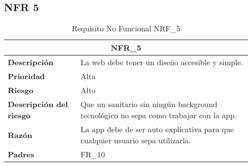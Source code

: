 \documentclass{scrreprt}
\begin{document}
\subsection{NFR 5}
\begin{table}[H]
    \label{tab:my-table}
    \begin{tabular}{|p{5cm}|p{11cm}|}
    \hline
    \multicolumn{2}{|c|}{\textbf{NFR_5}} \\
    \hline
    \textbf{Descripción  }                      &  La web debe tener un diseño accesible y simple.                                                                            \\ \hline
    \textbf{Prioridad}                          & Alta                                                                                              \\ \hline
    \textbf{Riesgo}                          & Alto                                                                                                \\ \hline
    \textbf{Descripción del riesgo}                    & Que un sanitario sin ningún background tecnológico no sepa como trabajar con la app.                                                                               \\ \hline
    \textbf{Razón}                   & La app debe de ser auto explicativa para que cualquier usuario sepa utilizarla.       \\ \hline
    \textbf{Padres}                               &  FR_10\\  \hline
    \end{tabular}%
    
    \caption{Requisito No Funcional NRF_5}
\end{table}
\end{document}
